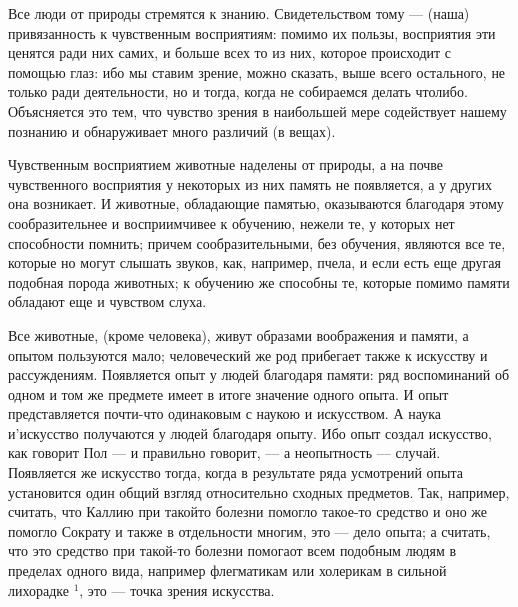 \documentclass[oneside, 17pt, dvipsnames]{extbook}
\begin{document}
Все люди от природы стремятся к знанию. Свидетельством тому --- (наша) привязанность к чувственным восприятиям: помимо их пользы, восприятия эти ценятся ради них самих, и больше всех то из них, которое происходит с помощью глаз: ибо мы ставим зрение, можно сказать, выше всего остального, не только ради деятельности, но и тогда, когда не собираемся делать чтолибо. Объясняется это тем, что чувство зрения в наибольшей мере содействует нашему познанию и обнаруживает много различий (в вещах).

Чувственным восприятием животные наделены от природы, а на почве чувственного восприятия у некоторых из них память не появляется, а у других она возникает. И животные, обладающие памятью, оказываются благодаря этому сообразительнее и восприимчивее к обучению, нежели те, у которых нет способности помнить; причем сообразительными, без обучения, являются все те, которые но могут слышать звуков, как, например, пчела, и если есть еще другая подобная порода животных; к обучению же способны те, которые помимо памяти обладают еще и чувством слуха.


Все животные, (кроме человека), живут образами воображения и памяти, а опытом пользуются мало; человеческий же род прибегает также к искусству и рассуждениям. Появляется опыт у людей благодаря памяти: ряд воспоминаний об одном и том же предмете имеет в итоге значение одного опыта. И опыт представляется почти-что одинаковым с наукою и искусством. А наука и'искусство получаются у людей благодаря опыту. Ибо опыт создал искусство, как говорит Пол --- и правильно говорит, --- а неопытность --- случай. Появляется же искусство тогда, когда в результате ряда усмотрений опыта установится один общий взгляд относительно сходных предметов. Так, например, считать, что Каллию при такойто болезни помогло такое-то средство и оно же помогло Сократу и также в отдельности многим, это --- дело опыта; а считать, что это средство при такой-то болезни помогаот всем подобным людям в пределах одного вида, например флегматикам или холерикам в сильной лихорадке $^1$, это --- точка зрения искусства.
\end{document}
